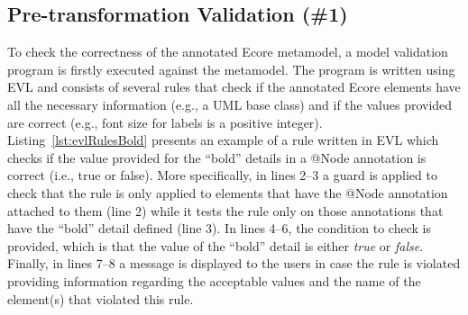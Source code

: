 \subsection{Pre-transformation Validation (\#1)}
To check the correctness of the annotated Ecore metamodel, a model validation program is firstly executed against the metamodel.
The program is written using EVL and consists of several rules that check if the annotated Ecore elements have all the necessary information (e.g., a UML base class) and if the values provided are correct (e.g., font size for labels is a positive integer). 
Listing~\ref{lst:evlRulesBold} presents an example of a rule written in EVL which checks if the value provided for the ``bold'' details in a @Node annotation is correct (i.e., true or false). More specifically, in lines 2--3 a guard is applied to check that the rule is only applied to elements that have the @Node annotation attached to them (line 2) while it tests the rule only on those annotations that have the ``bold'' detail defined (line 3). 
In lines 4--6, the condition to check is provided, which is that the value of the ``bold'' detail is either \textit{true} or \textit{false}. 
Finally, in lines 7--8 a message is displayed to the users in case the rule is violated providing information regarding the acceptable values and the name of the element(s) that violated this rule.



